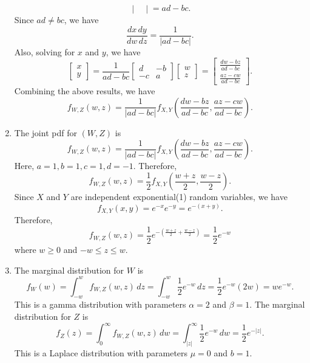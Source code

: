 \documentclass[12pt]{article}
\newenvironment{problem}[2][Problem]{\begin{trivlist}
\item[\hskip \labelsep {\bfseries #1}\hskip \labelsep {\bfseries #2.}]}
{\end{trivlist}}
\begin{document}
\begin{problem}{7}
\begin{enumerate}
\[\begin{vmatrix}
      \end{vmatrix} = ad - bc.
    \]
    Since $ad \neq bc$, we have
    \[
      \frac{dx \, dy}{dw \, dz} = \frac{1}{|ad - bc|}.
    \]
    Also, solving for $x$ and $y$, we have
    \[
      \begin{bmatrix}
        x \\ y
      \end{bmatrix} =
      \frac{1}{ad - bc}
      \begin{bmatrix}
        d & -b \\ -c & a
      \end{bmatrix}
      \begin{bmatrix}
        w \\ z
      \end{bmatrix} =
      \begin{bmatrix}
        \frac{dw - bz}{ad - bc} \\ \frac{az - cw}{ad - bc}
      \end{bmatrix}.
    \]
    Combining the above results, we have
    \[
      f_{W,Z} (w, z) = \frac{1}{|ad - bc|} f_{X,Y} 
      \left( \frac{dw - bz}{ad - bc}, \frac{az - cw}{ad - bc} \right).
    \]
    \item The joint pdf for $(W, Z)$ is 
    \[
      f_{W,Z} (w, z) = \frac{1}{|ad - bc|} f_{X,Y} 
      \left( \frac{dw - bz}{ad - bc}, \frac{az - cw}{ad - bc} \right).
    \]
    Here, $a = 1, b = 1, c = 1, d = -1$. Therefore,
    \[
      f_{W,Z} (w, z) = \frac{1}{2} f_{X,Y} 
      \left( \frac{w + z}{2}, \frac{w - z}{2} \right).
    \]
    Since $X$ and $Y$ are independent exponential(1) random variables, we have
    \[
      f_{X,Y} (x, y) = e^{-x} e^{-y} = e^{-(x+y)}.
    \]
    Therefore,
    \[
      f_{W,Z} (w, z) = \frac{1}{2} e^{-\left( \frac{w + z}{2} + \frac{w - z}{2} \right)} 
      = \frac{1}{2} e^{-w}
    \]
    where $w \geq 0$ and $-w \leq z \leq w$.
    \item The marginal distribution for $W$ is
    \[
      f_W (w) = \int_{-w}^{w} f_{W,Z} (w, z) \, dz = \int_{-w}^{w} \frac{1}{2} e^{-w} \, dz = \frac{1}{2} e^{-w} (2w) = w e^{-w}.
    \]
    This is a gamma distribution with parameters $\alpha = 2$ and $\beta = 1$. The marginal distribution for $Z$ is
    \[
      f_Z (z) = \int_{0}^{\infty} f_{W,Z} (w, z) \, dw = \int_{|z|}^{\infty} \frac{1}{2} e^{-w} \, dw = \frac{1}{2} e^{-|z|}.
    \]
    This is a Laplace distribution with parameters $\mu = 0$ and $b = 1$.
  \end{enumerate}
\end{problem}
\end{document}

